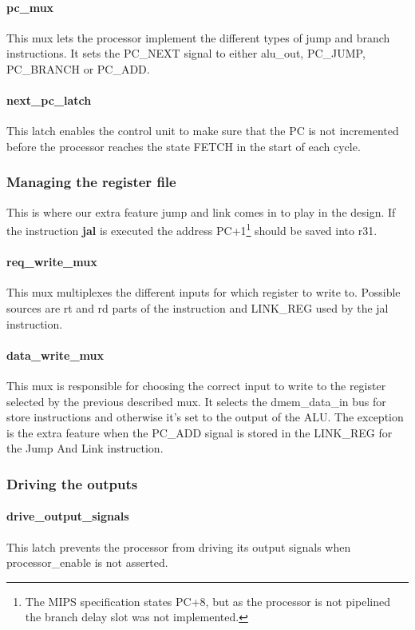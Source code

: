 \paragraph{pc\_mux} This mux lets the processor implement the different types of jump 
and branch instructions. It sets the PC\_NEXT signal to either alu\_out, PC\_JUMP, PC\_BRANCH or PC\_ADD. 

\paragraph{next\_pc\_latch} This latch enables the control unit to make sure that the PC 
is not incremented before the processor reaches the state FETCH in the start of each cycle. 

\subsubsection{Managing the register file}

This is where our extra feature jump and link comes in to play in the design. If the instruction 
{\bf jal} is executed the address PC+1\footnote{The MIPS specification states PC+8, but as the processor 
is not pipelined the branch delay slot was not implemented.} should be saved into r31.

\paragraph{req\_write\_mux} This mux multiplexes the different inputs for which register to write to. 
Possible sources are rt and rd parts of the instruction and LINK\_REG used by the jal instruction. 

\paragraph{data\_write\_mux} This mux is responsible for choosing the correct input to write to the 
register selected by the previous described mux. It selects the dmem\_data\_in bus for store instructions 
and otherwise it's set to the output of the ALU. The exception is the extra feature when the PC\_ADD signal 
is stored in the LINK\_REG for the Jump And Link instruction.

\subsubsection{Driving the outputs}

\paragraph{drive\_output\_signals} This latch prevents the processor from driving its 
output signals when processor\_enable is not asserted. 

